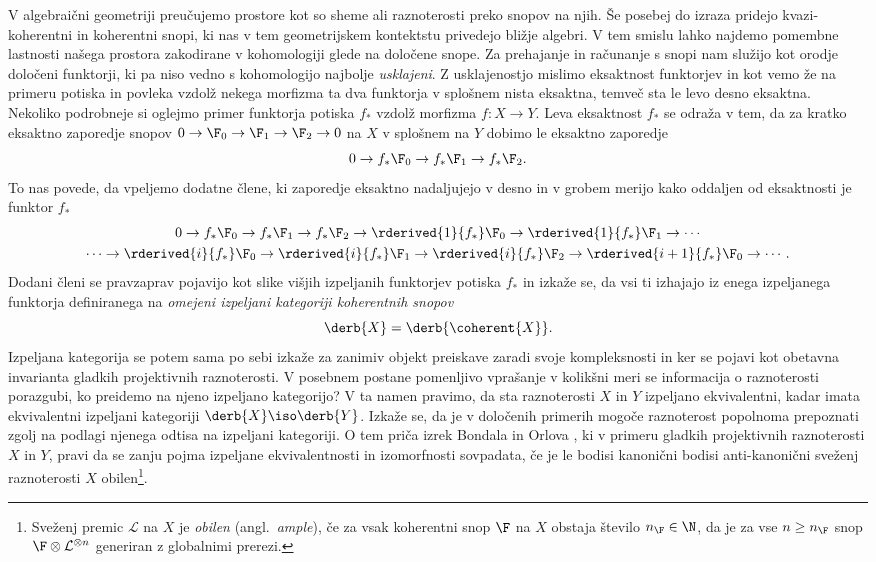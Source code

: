 

V algebraični geometriji preučujemo prostore kot so sheme ali raznoterosti preko snopov na njih. Še posebej do izraza pridejo kvazi-koherentni in koherentni snopi, ki nas v tem geometrijskem kontektstu privedejo bližje algebri. V tem smislu lahko najdemo pomembne lastnosti našega prostora zakodirane v kohomologiji glede na določene snope.
Za prehajanje in računanje s snopi nam služijo kot orodje določeni funktorji, ki pa niso vedno s kohomologijo najbolje \emph{usklajeni}. 
Z usklajenostjo mislimo eksaktnost funktorjev in kot vemo že na primeru potiska in povleka vzdolž nekega morfizma ta dva funktorja v splošnem nista eksaktna, temveč sta le levo \oz desno eksaktna. Nekoliko podrobneje si oglejmo primer funktorja potiska $f_*$ vzdolž morfizma $f \colon X \to Y$. Leva eksaktnost $f_*$ se odraža v tem, da za kratko eksaktno zaporedje snopov $0 \to \F_0 \to \F_1 \to \F_2 \to 0$ na $X$ v splošnem na $Y$ dobimo le eksaktno zaporedje
\[
    0 \to f_*\F_0 \to f_*\F_1 \to f_*\F_2.
\]
To nas povede, da vpeljemo dodatne člene, ki zaporedje eksaktno nadaljujejo v desno in v grobem merijo kako oddaljen od eksaktnosti je funktor $f_*$
\begin{multline*}
    0 \to f_*\F_0 \to f_*\F_1 \to f_*\F_2 \to \rderived{1}{f_*}\F_0 \to \rderived{1}{f_*}\F_1 \to \cdots \\
    \cdots \to \rderived{i}{f_*}\F_0 \to \rderived{i}{f_*}\F_1 \to \rderived{i}{f_*}\F_2 \to \rderived{i+1}{f_*}\F_0 \to \cdots.
\end{multline*}
Dodani členi se pravzaprav pojavijo kot slike višjih izpeljanih funktorjev potiska $f_*$ in izkaže se, da vsi ti izhajajo iz enega izpeljanega funktorja definiranega na \emph{omejeni izpeljani kategoriji koherentnih snopov}
\[
    \derb{X} = \derb{\coherent{X}}.
\]
Izpeljana kategorija se potem sama po sebi izkaže za zanimiv objekt preiskave zaradi svoje kompleksnosti in ker se pojavi kot obetavna invarianta gladkih projektivnih raznoterosti. V posebnem postane pomenljivo vprašanje v kolikšni meri se informacija o raznoterosti porazgubi, ko preidemo na njeno izpeljano kategorijo?  V ta namen pravimo, da sta raznoterosti $X$ in $Y$ izpeljano ekvivalentni, kadar imata ekvivalentni izpeljani kategoriji $\derb{X}\iso \derb{Y}$. Izkaže se, da je v določenih primerih mogoče raznoterost popolnoma prepoznati zgolj na podlagi njenega odtisa na izpeljani kategoriji. O tem priča izrek Bondala in Orlova \cite{BondalOrlov2001}, ki v primeru gladkih projektivnih raznoterosti $X$ in $Y$, pravi da se zanju pojma izpeljane ekvivalentnosti in izomorfnosti sovpadata, če je le bodisi kanonični bodisi anti-kanonični sveženj raznoterosti $X$ obilen\footnote{
    Sveženj premic $\mathcal L$ na $X$ je \emph{obilen} (angl.~\emph{ample}), če za vsak koherentni snop $\F$ na $X$ obstaja število $n_\F \in \N$, da je za vse $n \geq n_\F$ snop $\F \otimes \mathcal L^{\otimes n}$ generiran z globalnimi prerezi.
}.
